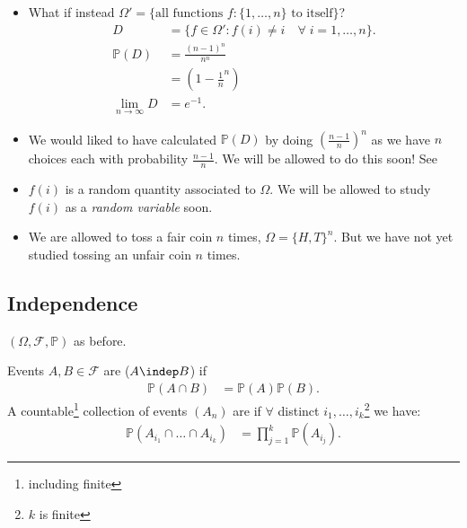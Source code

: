 \begin{example}[Derangements]
    \begin{remark} \mbox{}
        \begin{itemize}
            \item What if instead $\Omega' = \{\text{all functions } f : \{1, \dots, n\} \text{ to itself} \}$?
            \begin{align*}
                D &= \{f \in \Omega' : f(i) \neq i \quad \forall \; i = 1, \dots, n\}. \\
                \mathbb{P}(D) &= \frac{(n-1)^n}{n^n} \\
                &= \left(1 - \frac{1}{n}^n \right) \\
                \lim_{n \to \infty} D &= e^{-1}.
            \end{align*} 
            \item We would liked to have calculated $\mathbb{P}(D)$ by doing $\left(\frac{n - 1}{n}\right)^n$ as we have $n$ choices each with probability $\frac{n - 1}{n}$.
            We will be allowed to do this soon! See  
            \item $f(i)$ is a random quantity associated to $\Omega$.
            We will be allowed to study $f(i)$ as a \emph{random variable} soon.
            \item We are allowed to toss a fair coin $n$ times, $\Omega = \{H, T\}^n$.
            But we have not yet studied tossing an unfair coin $n$ times.
        \end{itemize} 
    \end{remark} 
\end{example} 

\subsection{Independence}
$(\Omega, \mathcal{F}, \mathbb{P})$ as before.

\begin{definition}[Indepence]
    Events $A, B \in \mathcal{F}$ are  ($A \indep B$) if
    \begin{align*}
        \mathbb{P}(A \cap B) &= \mathbb{P}(A) \mathbb{P}(B).
    \end{align*} 
    A countable\footnote{including finite} collection of events $(A_n)$ are  if $\forall$ distinct $i_1, \dots, i_k$\footnote{$k$ is finite} we have:
    \begin{align*}
        \mathbb{P}(A_{i_1} \cap \dots \cap A_{i_k}) &= \prod_{j = 1}^k \mathbb{P}(A_{i_j}).
    \end{align*} 
\end{definition} 

